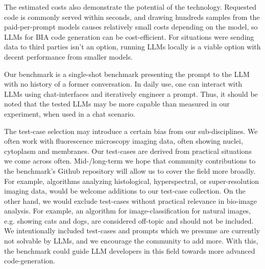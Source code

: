 \documentclass{ecai}
\begin{document}
The estimated costs also demonstrate the potential of the technology. Requested code is commonly served within seconds, and drawing hundreds samples from the paid-per-prompt models causes relatively small costs depending on the model, so LLMs for BIA code generation can be cost-efficient. For situations were sending data to third parties isn't an option, running LLMs locally is a viable option with decent performance from smaller models.

Our benchmark is a single-shot benchmark presenting the prompt to the LLM with no history of a former conversation. In daily use, one can interact with LLMs using chat-interfaces and iteratively engineer a prompt. Thus, it should be noted that the tested LLMs may be more capable than measured in our experiment, when used in a chat scenario.

The test-case selection may introduce a certain bias from our sub-disciplines. We often work with fluorescence microscopy imaging data, often showing nuclei, cytoplasm and membranes. Our test-cases are derived from practical situations we come across often. Mid-/long-term we hope that community contributions to the benchmark's Github repository will allow us to cover the field more broadly. For example, algorithms analyzing histological, hyperspectral, or super-resolution imaging data, would be welcome additions to our test-case collection. On the other hand, we would exclude test-cases without practical relevance in bio-image analysis. For example, an algorithm for image-classification for natural images, e.g. showing cats and dogs, are considered off-topic and should not be included. We intentionally included test-cases and prompts which we presume are currently not solvable by LLMs, and we encourage the community to add more. With this, the benchmark could guide LLM developers in this field towards more advanced code-generation.
\end{document}
